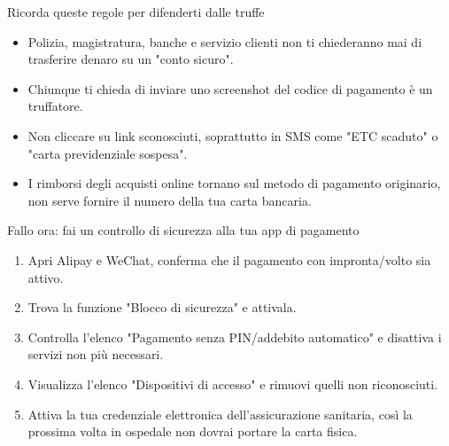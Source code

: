\begin{tcbwarn}{Ricorda queste regole per difenderti dalle truffe}
\begin{itemize}
  \item Polizia, magistratura, banche e servizio clienti non ti chiederanno mai di trasferire denaro su un "conto sicuro".
  \item Chiunque ti chieda di inviare uno screenshot del codice di pagamento è un truffatore.
  \item Non cliccare su link sconosciuti, soprattutto in SMS come "ETC scaduto" o "carta previdenziale sospesa".
  \item I rimborsi degli acquisti online tornano sul metodo di pagamento originario, non serve fornire il numero della tua carta bancaria.
\end{itemize}

\end{tcbwarn}

\begin{tcbpractice}{Fallo ora: fai un controllo di sicurezza alla tua app di pagamento}
\begin{enumerate}
  \item Apri Alipay e WeChat, conferma che il pagamento con impronta/volto sia attivo.
  \item Trova la funzione "Blocco di sicurezza" e attivala.
  \item Controlla l'elenco "Pagamento senza PIN/addebito automatico" e disattiva i servizi non più necessari.
  \item Visualizza l'elenco "Dispositivi di accesso" e rimuovi quelli non riconosciuti.
  \item Attiva la tua credenziale elettronica dell'assicurazione sanitaria, così la prossima volta in ospedale non dovrai portare la carta fisica.
\end{enumerate}

\end{tcbpractice}
